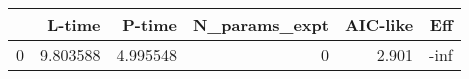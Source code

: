 \begin{tabular}{lrrrrr}
\toprule
{} &    L-time &    P-time &  N\_params\_expt &  AIC-like &  Eff \\
\midrule
0 &  9.803588 &  4.995548 &              0 &     2.901 & -inf \\
\bottomrule
\end{tabular}
